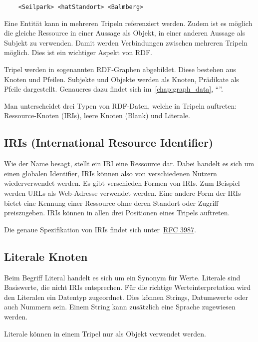 \begin{lstlisting}
    <Seilpark> <hatStandort> <Balmberg>
\end{lstlisting}

Eine Entität kann in mehreren Tripeln referenziert werden. Zudem ist es möglich die gleiche Ressource in einer Aussage als Objekt, in einer anderen Aussage als Subjekt zu verwenden. Damit werden Verbindungen zwischen mehreren Tripeln möglich. Dies ist ein wichtiger Aspekt von RDF.\@

Tripel werden in sogenannten RDF-Graphen abgebildet. Diese bestehen aus Knoten und Pfeilen. Subjekte und Objekte werden als Knoten, Prädikate als Pfeile dargestellt. Genaueres dazu findet sich im~\autoref{chap:graph_data}, ``''.

Man unterscheidet drei Typen von RDF-Daten, welche in Tripeln auftreten: Ressource-Knoten (IRIs), leere Knoten (Blank) und Literale.

\subsection{IRIs (International Resource Identifier)}
\label{sec:rdf_rdf_dataModel_iris}
Wie der Name besagt, stellt ein IRI eine Ressource dar. Dabei handelt es sich um einen globalen Identifier, IRIs können also von verschiedenen Nutzern wiederverwendet werden. Es gibt verschieden Formen von IRIs. Zum Beispiel werden URLs als Web-Adresse verwendet werden. Eine andere Form der IRIs bietet eine Kennung einer Ressource ohne deren Standort oder Zugriff preiszugeben. IRIs können in allen drei Positionen eines Tripels auftreten.

Die genaue Spezifikation von IRIs findet sich unter~\href{http://www.ietf.org/rfc/rfc3987.txt}{RFC 3987}.

\subsection{Literale Knoten}
\label{sec:rdf_rdf_dataModel_literal}
Beim Begriff Literal handelt es sich um ein Synonym für Werte. Literale sind Basiswerte, die nicht IRIs entsprechen. Für die richtige Werteinterpretation wird den Literalen ein Datentyp zugeordnet. Dies können Strings, Datumswerte oder auch Nummern sein. Einem String kann zusätzlich eine Sprache zugewiesen werden.

Literale können in einem Tripel nur als Objekt verwendet werden.

